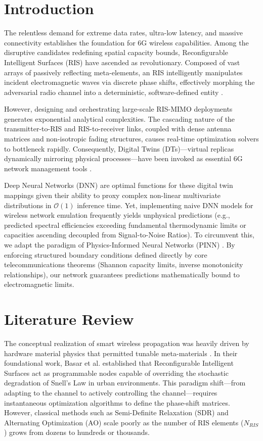 \documentclass[conference]{IEEEtran}
\begin{document}
\section{Introduction}

The relentless demand for extreme data rates, ultra-low latency, and massive connectivity establishes the foundation for 6G wireless capabilities. Among the disruptive candidates redefining spatial capacity bounds, Reconfigurable Intelligent Surfaces (RIS) have ascended as revolutionary. Composed of vast arrays of passively reflecting meta-elements, an RIS intelligently manipulates incident electromagnetic waves via discrete phase shifts, effectively morphing the adversarial radio channel into a deterministic, software-defined entity \cite{basar2019}.

However, designing and orchestrating large-scale RIS-MIMO deployments generates exponential analytical complexities. The cascading nature of the transmitter-to-RIS and RIS-to-receiver links, coupled with dense antenna matrices and non-isotropic fading structures, causes real-time optimization solvers to bottleneck rapidly. Consequently, Digital Twins (DTs)—virtual replicas dynamically mirroring physical processes—have been invoked as essential 6G network management tools \cite{metaverse2021}. 

Deep Neural Networks (DNN) are optimal functions for these digital twin mappings given their ability to proxy complex non-linear multivariate distributions in $\mathcal{O}(1)$ inference time. Yet, implementing naive DNN models for wireless network emulation frequently yields unphysical predictions (e.g., predicted spectral efficiencies exceeding fundamental thermodynamic limits or capacities ascending decoupled from Signal-to-Noise Ratios). To circumvent this, we adapt the paradigm of Physics-Informed Neural Networks (PINN) \cite{raissi2019}. By enforcing structured boundary conditions defined directly by core telecommunications theorems (Shannon capacity limits, inverse monotonicity relationships), our network guarantees predictions mathematically bound to electromagnetic limits.

\section{Literature Review}

The conceptual realization of smart wireless propagation was heavily driven by hardware material physics that permitted tunable meta-materials \cite{basar2019}. In their foundational work, Basar et al. established that Reconfigurable Intelligent Surfaces act as programmable nodes capable of overriding the stochastic degradation of Snell's Law in urban environments. This paradigm shift—from adapting to the channel to actively controlling the channel—requires instantaneous optimization algorithms to define the phase-shift matrices. However, classical methods such as Semi-Definite Relaxation (SDR) and Alternating Optimization (AO) scale poorly as the number of RIS elements ($N_{RIS}$) grows from dozens to hundreds or thousands. 
\end{document}
